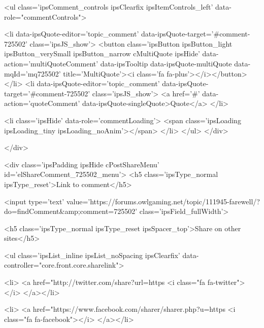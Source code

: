 					
				
				<ul class='ipsComment_controls ipsClearfix ipsItemControls_left' data-role="commentControls">
					
						
							<li data-ipsQuote-editor='topic_comment' data-ipsQuote-target='#comment-725502' class='ipsJS_show'>
								<button class='ipsButton ipsButton_light ipsButton_verySmall ipsButton_narrow cMultiQuote ipsHide' data-action='multiQuoteComment' data-ipsTooltip data-ipsQuote-multiQuote data-mqId='mq725502' title='MultiQuote'><i class='fa fa-plus'></i></button>
							</li>
							<li data-ipsQuote-editor='topic_comment' data-ipsQuote-target='#comment-725502' class='ipsJS_show'>
								<a href='#' data-action='quoteComment' data-ipsQuote-singleQuote>Quote</a>
							</li>
						
						
						
					
					<li class='ipsHide' data-role='commentLoading'>
						<span class='ipsLoading ipsLoading_tiny ipsLoading_noAnim'></span>
					</li>
				</ul>
			</div>
		

		
			

		
	</div>

	

	



<div class='ipsPadding ipsHide cPostShareMenu' id='elShareComment_725502_menu'>
	<h5 class='ipsType_normal ipsType_reset'>Link to comment</h5>
	
		
	
	
	<input type='text' value='https://forums.owlgaming.net/topic/111945-farewell/?do=findComment&amp;comment=725502' class='ipsField_fullWidth'>

	
	<h5 class='ipsType_normal ipsType_reset ipsSpacer_top'>Share on other sites</h5>
	

	<ul class='ipsList_inline ipsList_noSpacing ipsClearfix' data-controller="core.front.core.sharelink">
		
			<li>
<a href="http://twitter.com/share?url=https%
	<i class="fa fa-twitter"></i>
</a></li>
		
			<li>
<a href="https://www.facebook.com/sharer/sharer.php?u=https%
	<i class="fa fa-facebook"></i>
</a></li>
		
